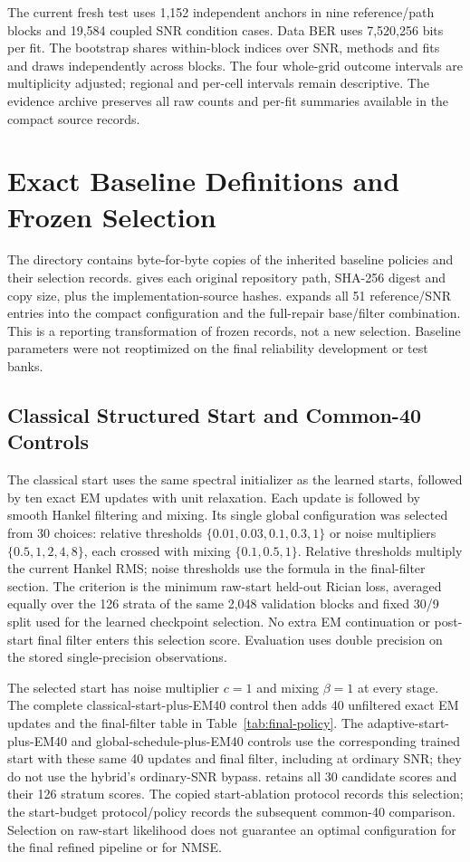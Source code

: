 The current fresh test uses 1,152 independent anchors in nine reference/path blocks and 19,584 coupled SNR condition cases. Data BER uses 7,520,256 bits per fit. The bootstrap shares within-block indices over SNR, methods and fits and draws independently across blocks. The four whole-grid outcome intervals are multiplicity adjusted; regional and per-cell intervals remain descriptive. The evidence archive preserves all raw counts and per-fit summaries available in the compact source records.

\section{Exact Baseline Definitions and Frozen Selection}
\label{sec:baseline-reproduction}
The directory  contains byte-for-byte copies of the inherited baseline policies and their selection records.  gives each original repository path, SHA-256 digest and copy size, plus the implementation-source hashes.  expands all 51 reference/SNR entries into the compact configuration and the full-repair base/filter combination. This is a reporting transformation of frozen records, not a new selection. Baseline parameters were not reoptimized on the final reliability development or test banks.

\subsection{Classical Structured Start and Common-40 Controls}
The classical start uses the same spectral initializer as the learned starts, followed by ten exact EM updates with unit relaxation. Each update is followed by smooth Hankel filtering and mixing. Its single global configuration was selected from 30 choices: relative thresholds $\{0.01,0.03,0.1,0.3,1\}$ or noise multipliers $\{0.5,1,2,4,8\}$, each crossed with mixing $\{0.1,0.5,1\}$. Relative thresholds multiply the current Hankel RMS; noise thresholds use the formula in the final-filter section. The criterion is the minimum raw-start held-out Rician loss, averaged equally over the 126 strata of the same 2,048 validation blocks and fixed 30/9 split used for the learned checkpoint selection. No extra EM continuation or post-start final filter enters this selection score. Evaluation uses double precision on the stored single-precision observations.

The selected start has noise multiplier $c=1$ and mixing $\beta=1$ at every stage. The complete classical-start-plus-EM40 control then adds 40 unfiltered exact EM updates and the final-filter table in Table~\ref{tab:final-policy}. The adaptive-start-plus-EM40 and global-schedule-plus-EM40 controls use the corresponding trained start with these same 40 updates and final filter, including at ordinary SNR; they do not use the hybrid's ordinary-SNR bypass.  retains all 30 candidate scores and their 126 stratum scores. The copied start-ablation protocol records this selection; the start-budget protocol/policy records the subsequent common-40 comparison. Selection on raw-start likelihood does not guarantee an optimal configuration for the final refined pipeline or for NMSE.

